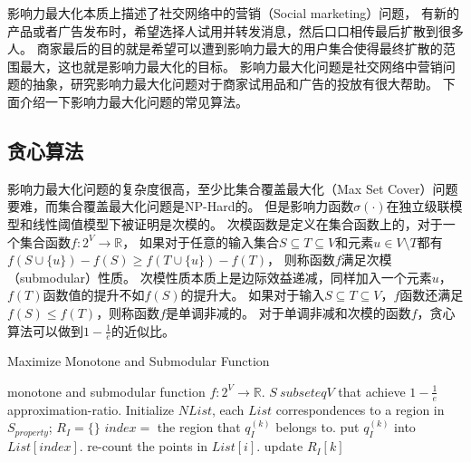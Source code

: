 影响力最大化本质上描述了社交网络中的营销（Social marketing）问题，
有新的产品或者广告发布时，希望选择人试用并转发消息，然后口口相传最后扩散到很多人。
商家最后的目的就是希望可以遭到影响力最大的用户集合使得最终扩散的范围最大，这也就是影响力最大化的目标。
影响力最大化问题是社交网络中营销问题的抽象，研究影响力最大化问题对于商家试用品和广告的投放有很大帮助。
下面介绍一下影响力最大化问题的常见算法。

\subsection{贪心算法}
影响力最大化问题的复杂度很高，至少比集合覆盖最大化（Max Set Cover）问题要难，而集合覆盖最大化问题是NP-Hard的。
但是影响力函数$\sigma(\cdot)$在独立级联模型和线性阈值模型下被证明是次模的\cite{Kempe2003maximizing}。
次模函数是定义在集合函数上的，对于一个集合函数$f:2^V \to \mathbb{R}$，
如果对于任意的输入集合$S \subseteq T \subseteq V$和元素$u \in V \setminus T$都有
$f(S \cup \{u\}) - f(S) \geq f(T \cup \{u\}) - f(T)$，
则称函数$f$满足次模（submodular）性质。
次模性质本质上是边际效益递减，同样加入一个元素$u$，$f(T)$函数值的提升不如$f(S)$的提升大。
如果对于输入$S \subseteq T \subseteq V$，$f$函数还满足$f(S) \leq f(T)$，则称函数$f$是单调非减的。
对于单调非减和次模的函数$f$，贪心算法可以做到$1-\frac{1}{e}$的近似比。

\begin{algorithm}
	\caption{Maximize Monotone and Submodular Function}
	\label{alg:1} 
	\begin{algorithmic}[1]
		\REQUIRE monotone and submodular function $f:2^V \to \mathbb{R}$.
		\ENSURE $S \ subseteq V$ that achieve $1-\frac{1}{e}$ approximation-ratio.
		\STATE Initialize $N List$, each $List$ correspondences to a region in $S_{property}$;
		\STATE $R_I = \{\}$
		\STATE $index=$ the region that $q_I^{(k)}$ belongs to.
		\STATE put $q_I^{(k)}$ into $List[index]$.
		\ENDFOR
		\STATE re-count the points in $List[i]$.
		\ENDIF
		\ENDFOR
		\STATE update $R_I[k]$
		\ENDFOR
	\end{algorithmic} 
\end{algorithm}





